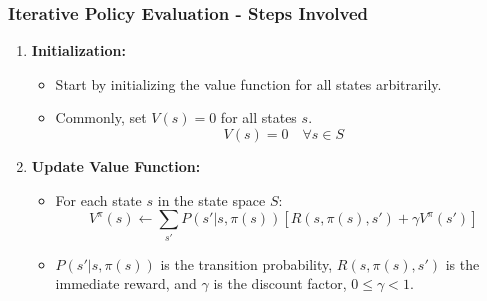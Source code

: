 \documentclass[aspectratio=169]{beamer}
\begin{document}
\begin{frame}[fragile]
    \frametitle{Iterative Policy Evaluation - Steps Involved}
    \begin{enumerate}
        \item \textbf{Initialization:}
            \begin{itemize}
                \item Start by initializing the value function for all states arbitrarily.
                \item Commonly, set \( V(s) = 0 \) for all states \( s \).
                \[
                V(s) = 0 \quad \forall s \in S
                \]
            \end{itemize}
        
        \item \textbf{Update Value Function:}
            \begin{itemize}
                \item For each state \( s \) in the state space \( S \):
                \[
                V^{\pi}(s) \gets \sum_{s'} P(s'|s, \pi(s))[R(s, \pi(s), s') + \gamma V^{\pi}(s')]
                \]
                \item \( P(s'|s, \pi(s)) \) is the transition probability, \( R(s, \pi(s), s') \) is the immediate reward, and \( \gamma \) is the discount factor, \( 0 \leq \gamma < 1 \).
            \end{itemize}
    \end{enumerate}
\end{frame}
\end{document}
